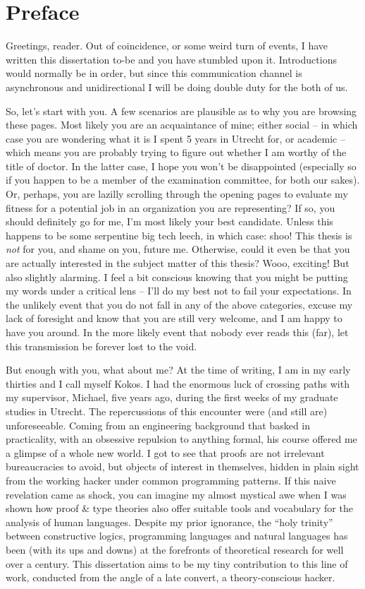 \chapter*{Preface}

Greetings, reader. Out of coincidence, or some weird turn of events, I have written this dissertation to-be and you have stumbled upon it.
Introductions would normally be in order, but since this communication channel is asynchronous and unidirectional I will be doing double duty for the both of us.

So, let's start with you. 
A few scenarios are plausible as to why you are browsing these pages. 
Most likely you are an acquaintance of mine; either social – in which case you are wondering what it is I spent 5 years in Utrecht for, or academic – which means you are probably trying to figure out whether I am worthy of the title of doctor. 
In the latter case, I hope you won’t be disappointed (especially so if you happen to be a member of the examination committee, for both our sakes).
Or, perhaps, you are lazilly scrolling through the opening pages to evaluate my fitness for a potential job in an organization you are representing? 
If so, you should definitely go for me, I'm most likely your best candidate.
Unless this happens to be some serpentine big tech leech, in which case: shoo!
This thesis is \textit{not} for you, and shame on you, future me.
Otherwise, could it even be that you are actually interested in the subject matter of this thesis? 
Wooo, exciting!
But also slightly alarming.
I feel a bit conscious knowing that you might be putting my words under a critical lens – I’ll do my best not to fail your expectations. 
In the unlikely event that you do not fall in any of the above categories, excuse my lack of foresight and know that you are still very welcome, and I am happy to have you around. 
In the more likely event that nobody ever reads this (far), let this transmission be forever lost to the void.

But enough with you, what about me? 
At the time of writing, I am in my early thirties and I call myself Kokos. 
I had the enormous luck of crossing paths with my supervisor, Michael, five years ago, during the first weeks of my graduate studies in Utrecht. 
The repercussions of this encounter were (and still are) unforeseeable. 
Coming from an engineering background that basked in practicality, with an obsessive repulsion to anything formal, his course offered me a glimpse of a whole new world. 
I got to see that proofs are not irrelevant bureaucracies to avoid, but objects of interest in themselves, hidden in plain sight from the working hacker under common programming patterns. 
If this naive revelation came as shock, you can imagine my almost mystical awe when I was shown how proof \& type theories also offer suitable tools and vocabulary for the analysis of human languages. 
Despite my prior ignorance, the “holy trinity” between constructive logics, programming languages and natural languages has been (with its ups and downs) at the forefronts of theoretical research for well over a century. 
This dissertation aims to be my tiny contribution to this line of work, conducted from the angle of a late convert, a theory-conscious hacker. 

